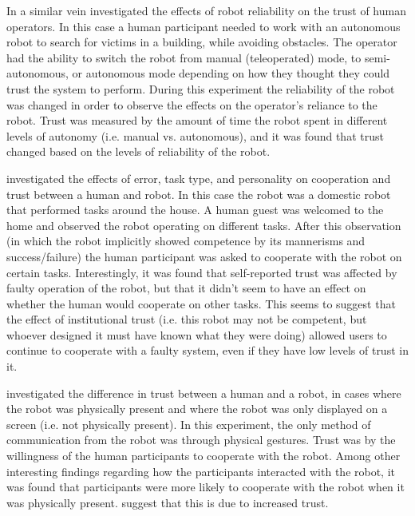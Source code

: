 In a similar vein \citet{Desai2012-rc} investigated the effects of robot reliability on the trust of human operators. In this case a human participant needed to work with an autonomous robot to search for victims in a building, while avoiding obstacles. The operator had the ability to switch the robot from manual (teleoperated) mode, to semi-autonomous, or autonomous mode depending on how they thought they could trust the system to perform. During this experiment the reliability of the robot was changed in order to observe the effects on the operator's reliance to the robot. Trust was measured by the amount of time the robot spent in different levels of autonomy (i.e. manual vs. autonomous), and it was found that trust changed based on the levels of reliability of the robot.

\citet{Salem2015-md} investigated the effects of error, task type, and personality on cooperation and trust between a human and robot. In this case the robot was a domestic robot that performed tasks around the house. A human guest was welcomed to the home and observed the robot operating on different tasks. After this observation (in which the robot implicitly showed competence by its mannerisms and success/failure) the human participant was asked to cooperate with the robot on certain tasks. Interestingly, it was found that self-reported trust was affected by faulty operation of the robot, but that it didn't seem to have an effect on whether the human would cooperate on other tasks. This seems to suggest that the effect of institutional trust (i.e. this robot may not be competent, but whoever designed it must have known what they were doing) allowed users to continue to cooperate with a faulty system, even if they have low levels of trust in it.

\citet{Bainbridge2011-pl} investigated the difference in trust between a human and a robot, in cases where the robot was physically present and where the robot was only displayed on a screen (i.e. not physically present). In this experiment, the only method of communication from the robot was through physical gestures. Trust was by the willingness of the human participants to cooperate with the robot. Among other interesting findings regarding how the participants interacted with the robot, it was found that participants were more likely to cooperate with the robot when it was physically present. \citeauthor{Bainbridge2011-pl} suggest that this is due to increased trust.

